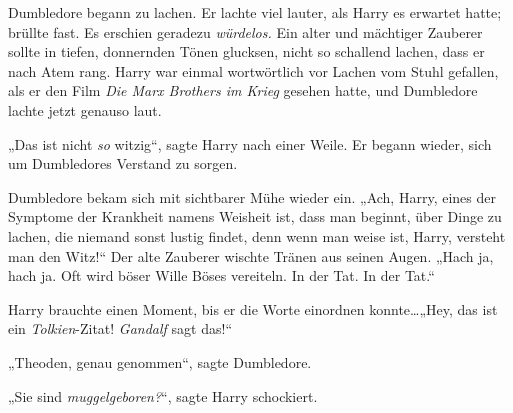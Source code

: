 Dumbledore begann zu lachen. Er lachte viel lauter, als Harry es erwartet hatte; brüllte fast. Es erschien geradezu \emph{würdelos.} Ein alter und mächtiger Zauberer sollte in tiefen, donnernden Tönen glucksen, nicht so schallend lachen, dass er nach Atem rang. Harry war einmal wortwörtlich vor Lachen vom Stuhl gefallen, als er den Film \emph{Die Marx Brothers im Krieg} gesehen hatte, und Dumbledore lachte jetzt genauso laut.

„Das ist nicht \emph{so} witzig“, sagte Harry nach einer Weile. Er begann wieder, sich um Dumbledores Verstand zu sorgen.

Dumbledore bekam sich mit sichtbarer Mühe wieder ein. „Ach, Harry, eines der Symptome der Krankheit namens Weisheit ist, dass man beginnt, über Dinge zu lachen, die niemand sonst lustig findet, denn wenn man weise ist, Harry, versteht man den Witz!“ Der alte Zauberer wischte Tränen aus seinen Augen. „Hach ja, hach ja. Oft wird böser Wille Böses vereiteln. In der Tat. In der Tat.“

Harry brauchte einen Moment, bis er die Worte einordnen konnte…„Hey, das ist ein \emph{Tolkien}-Zitat! \emph{Gandalf} sagt das!“

„Theoden, genau genommen“, sagte Dumbledore.

„Sie sind \emph{muggelgeboren?}“, sagte Harry schockiert.

